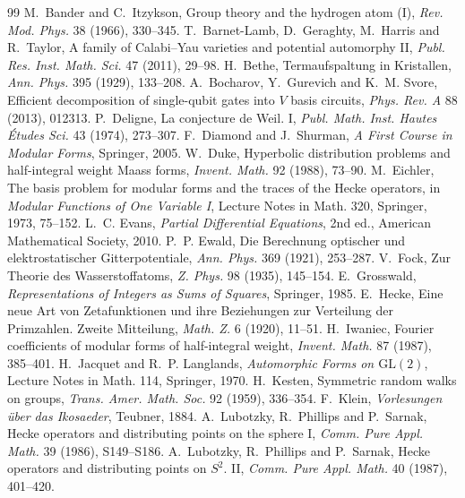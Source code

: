 \documentclass[11pt]{article}
\begin{document}
\begin{thebibliography}{99}
 M.~Bander and C.~Itzykson, Group theory and the hydrogen atom (I), \emph{Rev. Mod. Phys.} 38 (1966), 330--345.
 T.~Barnet-Lamb, D.~Geraghty, M.~Harris and R.~Taylor, A family of Calabi--Yau varieties and potential automorphy II, \emph{Publ. Res. Inst. Math. Sci.} 47 (2011), 29--98.
 H.~Bethe, Termaufspaltung in Kristallen, \emph{Ann. Phys.} 395 (1929), 133--208.
 A.~Bocharov, Y.~Gurevich and K.~M. Svore, Efficient decomposition of single-qubit gates into $V$ basis circuits, \emph{Phys. Rev. A} 88 (2013), 012313.
 P.~Deligne, La conjecture de Weil. I, \emph{Publ. Math. Inst. Hautes \'Etudes Sci.} 43 (1974), 273--307.
 F.~Diamond and J.~Shurman, \emph{A First Course in Modular Forms}, Springer, 2005.
 W.~Duke, Hyperbolic distribution problems and half-integral weight Maass forms, \emph{Invent. Math.} 92 (1988), 73--90.
 M.~Eichler, The basis problem for modular forms and the traces of the Hecke operators, in \emph{Modular Functions of One Variable I}, Lecture Notes in Math. 320, Springer, 1973, 75--152.
 L.~C. Evans, \emph{Partial Differential Equations}, 2nd ed., American Mathematical Society, 2010.
 P.~P. Ewald, Die Berechnung optischer und elektrostatischer Gitterpotentiale, \emph{Ann. Phys.} 369 (1921), 253--287.
 V.~Fock, Zur Theorie des Wasserstoffatoms, \emph{Z. Phys.} 98 (1935), 145--154.
 E.~Grosswald, \emph{Representations of Integers as Sums of Squares}, Springer, 1985.
 E.~Hecke, Eine neue Art von Zetafunktionen und ihre Beziehungen zur Verteilung der Primzahlen. Zweite Mitteilung, \emph{Math. Z.} 6 (1920), 11--51.
 H.~Iwaniec, Fourier coefficients of modular forms of half-integral weight, \emph{Invent. Math.} 87 (1987), 385--401.
 H.~Jacquet and R.~P. Langlands, \emph{Automorphic Forms on $\mathrm{GL}(2)$}, Lecture Notes in Math. 114, Springer, 1970.
 H.~Kesten, Symmetric random walks on groups, \emph{Trans. Amer. Math. Soc.} 92 (1959), 336--354.
 F.~Klein, \emph{Vorlesungen \"uber das Ikosaeder}, Teubner, 1884.
 A.~Lubotzky, R.~Phillips and P.~Sarnak, Hecke operators and distributing points on the sphere I, \emph{Comm. Pure Appl. Math.} 39 (1986), S149--S186.
 A.~Lubotzky, R.~Phillips and P.~Sarnak, Hecke operators and distributing points on $S^2$. II, \emph{Comm. Pure Appl. Math.} 40 (1987), 401--420.

\end{thebibliography}
\end{document}
